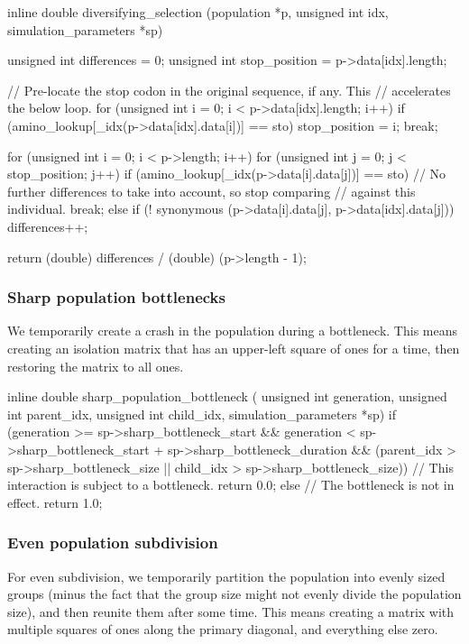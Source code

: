 \documentclass{article}
\begin{document}
\begin{ccode}
inline double diversifying_selection (population *p, unsigned int idx, simulation_parameters *sp) {
  unsigned int differences = 0;
  unsigned int stop_position = p->data[idx].length;

  // Pre-locate the stop codon in the original sequence, if any. This
  // accelerates the below loop.
  for (unsigned int i = 0; i < p->data[idx].length; i++)
    if (amino_lookup[_idx(p->data[idx].data[i])] == sto) {
      stop_position = i;
      break;
    }

  for (unsigned int i = 0; i < p->length; i++)
    for (unsigned int j = 0; j < stop_position; j++)
      if (amino_lookup[_idx(p->data[i].data[j])] == sto)
	// No further differences to take into account, so stop comparing
	// against this individual.
	break;
      else if (! synonymous (p->data[i].data[j], p->data[idx].data[j]))
	differences++;

  return (double) differences / (double) (p->length - 1);
}
\end{ccode}

      \subsubsection{Sharp population bottlenecks}

	We temporarily create a crash in the population during a bottleneck.
	This means creating an isolation matrix that has an upper-left square of
	ones for a time, then restoring the matrix to all ones.

\begin{ccode}
inline double sharp_population_bottleneck (
    unsigned int generation, unsigned int parent_idx,
    unsigned int child_idx, simulation_parameters *sp) {
  if (generation >= sp->sharp_bottleneck_start &&
      generation < sp->sharp_bottleneck_start + sp->sharp_bottleneck_duration &&
      (parent_idx > sp->sharp_bottleneck_size ||
       child_idx > sp->sharp_bottleneck_size))
    // This interaction is subject to a bottleneck.
    return 0.0;
  else
    // The bottleneck is not in effect.
    return 1.0;
}
\end{ccode}

      \subsubsection{Even population subdivision}

	For even subdivision, we temporarily partition the population into
	evenly sized groups (minus the fact that the group size might not evenly
	    divide the population size), and then reunite them after some time.
	This means creating a matrix with multiple squares of ones along the
	primary diagonal, and everything else zero.
\end{document}
